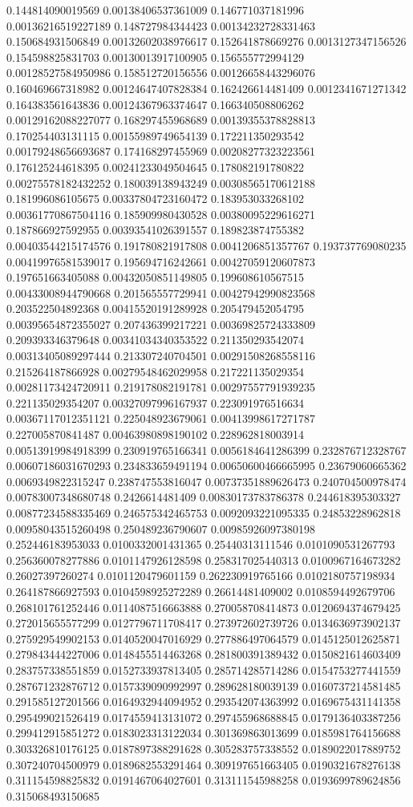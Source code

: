 \begin{table}
\begin{tabu}
\begin{sparkline}{10}
0.144814090019569 0.00138406537361009 0.146771037181996 0.00136216519227189 0.148727984344423 0.00134232728331463 0.150684931506849 0.00132602038976617 0.152641878669276 0.0013127347156526 0.154598825831703 0.00130013917100905 0.156555772994129 0.00128527584950986 0.158512720156556 0.00126658443296076 0.160469667318982 0.00124647407828384 0.162426614481409 0.0012341671271342 0.164383561643836 0.00124367963374647 0.166340508806262 0.00129162088227077 0.168297455968689 0.00139355378828813 0.170254403131115 0.00155989749654139 0.172211350293542 0.00179248656693687 0.174168297455969 0.00208277323223561 0.176125244618395 0.00241233049504645 0.178082191780822 0.00275578182432252 0.180039138943249 0.00308565170612188 0.181996086105675 0.00337804723160472 0.183953033268102 0.00361770867504116 0.185909980430528 0.00380095229616271 0.187866927592955 0.00393541026391557 0.189823874755382 0.00403544215174576 0.191780821917808 0.0041206851357767 0.193737769080235 0.00419976581539017 0.195694716242661 0.00427059120607873 0.197651663405088 0.00432050851149805 0.199608610567515 0.00433008944790668 0.201565557729941 0.00427942990823568 0.203522504892368 0.00415520191289928 0.205479452054795 0.00395654872355027 0.207436399217221 0.00369825724333809 0.209393346379648 0.00341034340353522 0.211350293542074 0.00313405089297444 0.213307240704501 0.00291508268558116 0.215264187866928 0.00279548462029958 0.217221135029354 0.00281173424720911 0.219178082191781 0.00297557791939235 0.221135029354207 0.00327097996167937 0.223091976516634 0.00367117012351121 0.225048923679061 0.00413998617271787 0.227005870841487 0.00463980898190102 0.228962818003914 0.00513919984918399 0.230919765166341 0.0056184641286399 0.232876712328767 0.00607186031670293 0.234833659491194 0.00650600466665995 0.23679060665362 0.0069349822315247 0.238747553816047 0.00737351889626473 0.240704500978474 0.00783007348680748 0.2426614481409 0.00830173783786378 0.244618395303327 0.00877234588335469 0.246575342465753 0.0092093221095335 0.24853228962818 0.00958043515260498 0.250489236790607 0.00985926097380198 0.252446183953033 0.0100332001431365 0.25440313111546 0.0101090531267793 0.256360078277886 0.0101147926128598 0.258317025440313 0.0100967164673282 0.26027397260274 0.0101120479601159 0.262230919765166 0.0102180757198934 0.264187866927593 0.0104598925272289 0.26614481409002 0.0108594492679706 0.268101761252446 0.0114087516663888 0.270058708414873 0.0120694374679425 0.272015655577299 0.0127796711708417 0.273972602739726 0.0134636973902137 0.275929549902153 0.0140520047016929 0.277886497064579 0.0145125012625871 0.279843444227006 0.0148455514463268 0.281800391389432 0.0150821614603409 0.283757338551859 0.0152733937813405 0.285714285714286 0.0154753277441559 0.287671232876712 0.0157339090992997 0.289628180039139 0.0160737214581485 0.291585127201566 0.0164932944094952 0.293542074363992 0.0169675431141358 0.295499021526419 0.0174559413131072 0.297455968688845 0.0179136403387256 0.299412915851272 0.0183023313122034 0.301369863013699 0.0185981764156688 0.303326810176125 0.0187897388291628 0.305283757338552 0.0189022017889752 0.307240704500979 0.0189682553291464 0.309197651663405 0.0190321678276138 0.311154598825832 0.0191467064027601 0.313111545988258 0.0193699789624856 0.315068493150685 
\end{sparkline}
\end{tabu}
\end{table}
